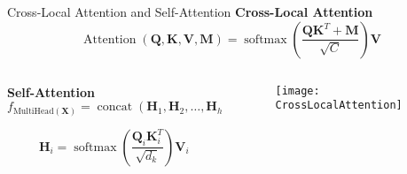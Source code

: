 \begin{frame}{Cross-Local Attention and Self-Attention}
	\small
	\textbf{Cross-Local Attention}
	\begin{equation*} \label{eq:attention}
		\operatorname{Attention}(\mathbf{Q}, \mathbf{K}, \mathbf{V}, \mathbf{M})=\operatorname{softmax}\left(\frac{\mathbf{Q} \mathbf{K}^{T}+\mathbf{M}}{\sqrt{C}}\right) \mathbf{V}
	\end{equation*}
	

	\begin{columns}
		
		\begin{column}{0.5\textwidth}
				\textbf{Self-Attention}
			$$
			f_{\text{MultiHead}(\mathbf{X})} = \operatorname{concat} \left( \mathbf{H}_1, \mathbf{H}_2, \dots, \mathbf{H}_h \right) \mathbf{W}_O
			$$
			
			$$
			\mathbf{H}_i = \operatorname{softmax} \left( \frac{\mathbf{Q}_i \mathbf{K}_i^T}{\sqrt{d_k}} \right) \mathbf{V}_i
			$$
		\end{column}
		
		\begin{column}{0.5\textwidth}
			\begin{figure}
				\centering
				\texttt{[image: CrossLocalAttention]}
			\end{figure}
		\end{column}
	\end{columns}
	
	
	
\end{frame}



%	
%	
%	
%
%	


